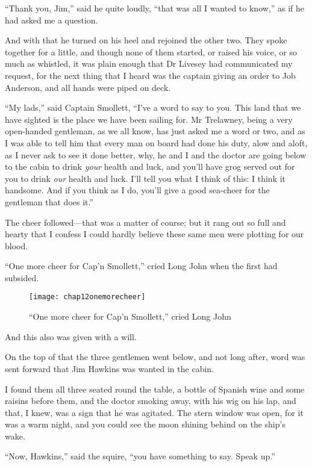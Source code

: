 \enquote{Thank you, Jim,} said he quite loudly, \enquote{that was all I wanted to know,} as if he had asked me a question.

And with that he turned on his heel and rejoined the other two. They spoke together for a little, and though none of them started, or raised his voice, or so much as whistled, it was plain enough that Dr Livesey had communicated my request, for the next thing that I heard was the captain giving an order to Job Anderson, and all hands were piped on deck.

\enquote{My lads,} said Captain Smollett, \enquote{I’ve a word to say to you. This land that we have sighted is the place we have been sailing for. Mr Trelawney, being a very open-handed gentleman, as we all know, has just asked me a word or two, and as I was able to tell him that every man on board had done his duty, alow and aloft, as I never ask to see it done better, why, he and I and the doctor are going below to the cabin to drink \textit{your} health and luck, and you’ll have grog served out for you to drink \textit{our} health and luck. I’ll tell you what I think of this: I think it handsome. And if you think as I do, you’ll give a good sea-cheer for the gentleman that does it.}

The cheer followed---that was a matter of course; but it rang out so full and hearty that I confess I could hardly believe these same men were plotting for our blood.

\enquote{One more cheer for Cap’n Smollett,} cried Long John when the first had subsided.

 \begin{sidewaysfigure}
\texttt{[image: chap12onemorecheer]}%
\caption{\enquote{One more cheer for Cap’n Smollett,} cried Long John}
\end{sidewaysfigure} 

And this also was given with a will.

On the top of that the three gentlemen went below, and not long after, word was sent forward that Jim Hawkins was wanted in the cabin.

I found them all three seated round the table, a bottle of Spanish wine and some raisins before them, and the doctor smoking away, with his wig on his lap, and that, I knew, was a sign that he was agitated. The stern window was open, for it was a warm night, and you could see the moon shining behind on the ship’s wake.

\enquote{Now, Hawkins,} said the squire, \enquote{you have something to say. Speak up.}

